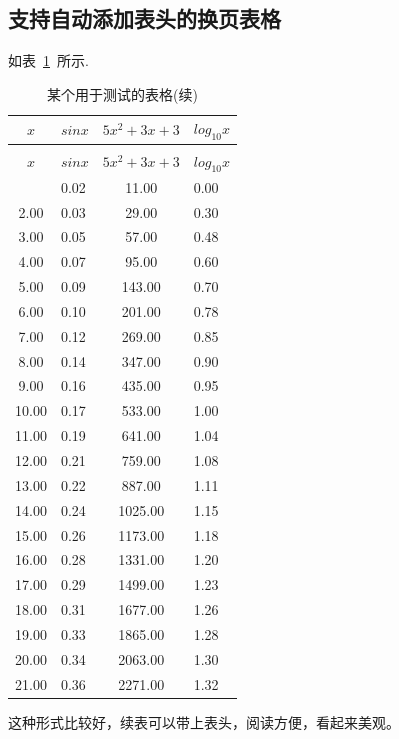\subsection{支持自动添加表头的换页表格}
如表~\ref{tab4}~所示.
\begin{center}
	\begin{longtable}{cp{1.5cm}cp{2cm}}
		\caption{某个用于测试的表格} \label{tab4} \\
		\hline
		\textbf{$x$}& \textbf{$sinx$} & \textbf{$5x^{2}+3x+3$}& \textbf{$log_{10}x$}\\
		\hline
		\endfirsthead
		\caption*{某个用于测试的表格(续)}\\
		\hline
		\textbf{$x$}& \textbf{$sinx$} & \textbf{$5x^{2}+3x+3$}& \textbf{$log_{10}x$}\\
		\hline
		\endhead
		\hline
		\endfoot
		\hline
		\endlastfoot
		1.00 & 0.02 & 11.00 & 0.00\\
		2.00 & 0.03 & 29.00 & 0.30\\
		3.00 & 0.05 & 57.00 & 0.48\\
		4.00 & 0.07 & 95.00 & 0.60\\
		5.00 & 0.09 & 143.00 & 0.70\\
		6.00 & 0.10 & 201.00 & 0.78\\
		7.00 & 0.12 & 269.00 & 0.85\\
		8.00 & 0.14 & 347.00 & 0.90\\
		9.00 & 0.16 & 435.00 & 0.95\\
		10.00 & 0.17 & 533.00 & 1.00\\
		11.00 & 0.19 & 641.00 & 1.04\\
		12.00 & 0.21 & 759.00 & 1.08\\
		13.00 & 0.22 & 887.00 & 1.11\\
		14.00 & 0.24 & 1025.00 & 1.15\\
		15.00 & 0.26 & 1173.00 & 1.18\\
		16.00 & 0.28 & 1331.00 & 1.20\\
		17.00 & 0.29 & 1499.00 & 1.23\\
		18.00 & 0.31 & 1677.00 & 1.26\\
		19.00 & 0.33 & 1865.00 & 1.28\\
		20.00 & 0.34 & 2063.00 & 1.30\\
		21.00 & 0.36 & 2271.00 & 1.32\\
		\hline
	\end{longtable}
\end{center}
这种形式比较好，续表可以带上表头，阅读方便，看起来美观。

